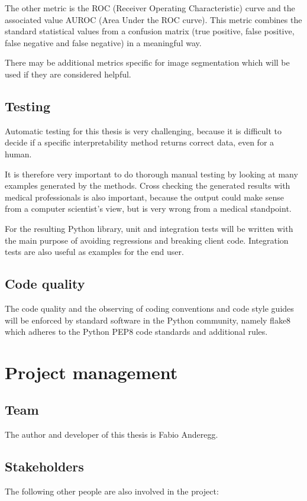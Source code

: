The other metric is the ROC (Receiver Operating Characteristic) curve and the associated value AUROC (Area Under the ROC curve). This metric combines the standard statistical values from a confusion matrix (true positive, false positive, false negative and false negative) in a meaningful way.

There may be additional metrics specific for image segmentation which will be used if they are considered helpful.

\section{Testing}
Automatic testing for this thesis is very challenging, because it is difficult to decide if a specific interpretability method returns correct data, even for a human.

It is therefore very important to do thorough manual testing by looking at many examples generated by the methods. Cross checking the generated results with medical professionals is also important, because the output could make sense from a computer scientist's view, but is very wrong from a medical standpoint.

For the resulting Python library, unit and integration tests will be written with the main purpose of avoiding regressions and breaking client code. Integration tests are also useful as examples for the end user.

\section{Code quality}
The code quality and the observing of coding conventions and code style guides will be enforced by standard software in the Python community, namely flake8 which adheres to the Python PEP8 code standards and additional rules.

\chapter{Project management}
    \section{Team}
    The author and developer of this thesis is Fabio Anderegg.
    
    \section{Stakeholders}
    The following other people are also involved in the project:
    
